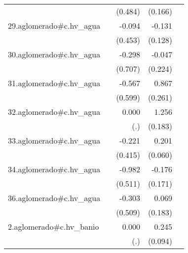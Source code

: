 {\begin{longtable}{l*{4}{D{.}{.}{-1}}}
            &                     &     (0.484)         &     (0.166)         &                     \\
\addlinespace
29.aglomerado#c.hv\_agua&                     &      -0.094         &      -0.131         &                     \\
            &                     &     (0.453)         &     (0.128)         &                     \\
\addlinespace
30.aglomerado#c.hv\_agua&                     &      -0.298         &      -0.047         &                     \\
            &                     &     (0.707)         &     (0.224)         &                     \\
\addlinespace
31.aglomerado#c.hv\_agua&                     &      -0.567         &       0.867\sym{***}&                     \\
            &                     &     (0.599)         &     (0.261)         &                     \\
\addlinespace
32.aglomerado#c.hv\_agua&                     &       0.000         &       1.256\sym{***}&                     \\
            &                     &         (.)         &     (0.183)         &                     \\
\addlinespace
33.aglomerado#c.hv\_agua&                     &      -0.221         &       0.201\sym{***}&                     \\
            &                     &     (0.415)         &     (0.060)         &                     \\
\addlinespace
34.aglomerado#c.hv\_agua&                     &      -0.982         &      -0.176         &                     \\
            &                     &     (0.511)         &     (0.171)         &                     \\
\addlinespace
36.aglomerado#c.hv\_agua&                     &      -0.303         &       0.069         &                     \\
            &                     &     (0.509)         &     (0.183)         &                     \\
\addlinespace
2.aglomerado#c.hv\_banio&                     &       0.000         &       0.245\sym{**} &                     \\
            &                     &         (.)         &     (0.094)         &                     \\

\end{longtable}}
